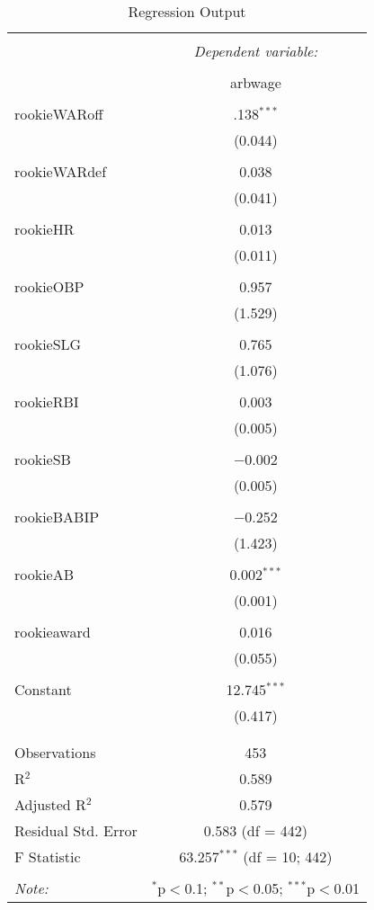 \documentclass{article}
\begin{document}
\pagebreak




\pagebreak

\begin{table}[!htbp] \centering 
  \caption{Regression Output} 
  \label{} 
\begin{tabular}{@{\extracolsep{5pt}}lc} 
\\[-1.8ex]\hline 
\hline \\[-1.8ex] 
 & \multicolumn{1}{c}{\textit{Dependent variable:}} \\ 
\cline{2-2} 
\\[-1.8ex] & arbwage \\ 
\hline \\[-1.8ex] 
 rookieWARoff & .138$^{***}$ \\ 
  & (0.044) \\ 
  & \\ 
 rookieWARdef & 0.038 \\ 
  & (0.041) \\ 
  & \\ 
 rookieHR & 0.013 \\ 
  & (0.011) \\ 
  & \\ 
 rookieOBP & 0.957 \\ 
  & (1.529) \\ 
  & \\ 
 rookieSLG & 0.765 \\ 
  & (1.076) \\ 
  & \\ 
 rookieRBI & 0.003 \\ 
  & (0.005) \\ 
  & \\ 
 rookieSB & $-$0.002 \\ 
  & (0.005) \\ 
  & \\ 
 rookieBABIP & $-$0.252 \\ 
  & (1.423) \\ 
  & \\ 
 rookieAB & 0.002$^{***}$ \\ 
  & (0.001) \\ 
  & \\ 
 rookieaward & 0.016 \\ 
  & (0.055) \\ 
  & \\ 
 Constant & 12.745$^{***}$ \\ 
  & (0.417) \\ 
  & \\ 
\hline \\[-1.8ex] 
Observations & 453 \\ 
R$^{2}$ & 0.589 \\ 
Adjusted R$^{2}$ & 0.579 \\ 
Residual Std. Error & 0.583 (df = 442) \\ 
F Statistic & 63.257$^{***}$ (df = 10; 442) \\ 
\hline 
\hline \\[-1.8ex] 
\textit{Note:}  & \multicolumn{1}{r}{$^{*}$p$<$0.1; $^{**}$p$<$0.05; $^{***}$p$<$0.01} \\ 
\end{tabular} 
\end{table} 
\end{document}
